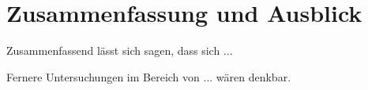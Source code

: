 \chapter{Zusammenfassung und Ausblick}
    Zusammenfassend lässt sich sagen, dass sich  ...

    Fernere Untersuchungen im Bereich von ... wären denkbar.
